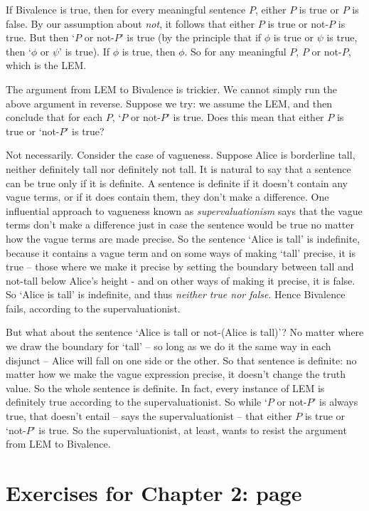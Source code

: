 {\begin{enumerate}
If Bivalence is true, then for every meaningful sentence $P$, either $P$ is true or $P$ is false. By our assumption about \emph{not}, it follows that either $P$ is true or not-$P$ is true. But then `$P$ or not-$P$' is true (by the principle that if $\phi$ is true or $\psi$ is true, then `$\phi$ or $\psi$' is true). If $\phi$ is true, then $\phi$. So for any meaningful $P$, $P$ or not-$P$, which is the LEM.

The argument from LEM to Bivalence is trickier. We cannot simply run the above argument in reverse. Suppose we try: we assume the LEM, and then conclude that for each $P$, `$P$ or not-$P$' is true. Does this mean that either $P$ is true or `not-$P$' is true? 

Not necessarily. Consider the case of vagueness. Suppose Alice is borderline tall, neither definitely tall nor definitely not tall. It is natural to say that a sentence can be true only if it is definite. A sentence is definite if it doesn't contain any vague terms, or if it does contain them, they don't make a difference. One influential approach to vagueness known as \emph{supervaluationism} \citep{fine} says that the vague terms don't make a difference just in case the sentence would be true no matter how the vague terms are made precise. So the sentence `Alice is tall' is indefinite, because it contains a vague term and on some ways of making `tall' precise, it is true – those where we make it precise by setting the boundary between tall and not-tall below Alice's height - and on other ways of making it precise, it is false. So `Alice is tall' is indefinite, and thus \emph{neither true nor false}. Hence Bivalence fails, according to the supervaluationist.

But what about the sentence `Alice is tall or not-(Alice is tall)'? No matter where we draw the boundary for `tall' – so long as we do it the same way in each disjunct – Alice will fall on one side or the other. So that sentence is definite: no matter how we make the vague expression precise, it doesn't change the truth value. So the whole sentence is definite. In fact, every instance of LEM is definitely true according to the supervaluationist. So while `$P$ or not-$P$' is always true, that doesn't entail – says the supervaluationist – that either $P$ is true or `not-$P$' is true. So the supervaluationist, at least, wants to resist the argument from LEM to Bivalence.
\end{enumerate}

\section*{Exercises for Chapter 2: page \pageref{ex2}} \label{ans2}

}

